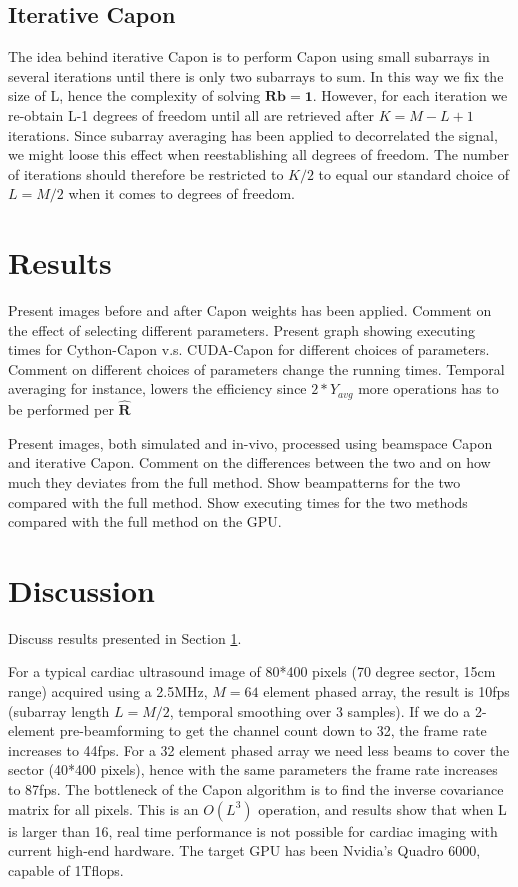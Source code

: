 \documentclass[journal]{IEEEtran}
\newcommand{\mat}[1]{\mathbf{#1}}
\renewcommand{\vec}[1]{\mathbf{#1}}
\begin{document}
\subsection{Iterative Capon}
The idea behind iterative Capon is to perform Capon using small subarrays in several iterations until there is only two subarrays to sum. In this way we fix the size of L, hence the complexity of solving $\mat{R}\vec{b} = \vec{1}$. However, for each iteration we re-obtain L-1 degrees of freedom until all are retrieved after $K = M-L+1$ iterations. Since subarray averaging has been applied to decorrelated the signal, we might loose this effect when reestablishing all degrees of freedom. The number of iterations should therefore be restricted to $K/2$ to equal our standard choice of $L = M/2$ when it comes to degrees of freedom.   

\section{Results}\label{sec:res}

Present images before and after Capon weights has been applied. Comment on the effect of selecting different parameters. Present graph showing executing times for Cython-Capon v.s. CUDA-Capon for different choices of parameters. Comment on different choices of parameters change the running times. Temporal averaging for instance, lowers the efficiency since $2*Y_{avg}$ more operations has to be performed per $\mat{\hat{R}}$    

Present images, both simulated and in-vivo, processed using beamspace Capon and iterative Capon. Comment on the differences between the two and on how much they deviates from the full method.
Show beampatterns for the two compared with the full method. Show executing times for the two methods compared with the full method on the GPU.

\section{Discussion}\label{sec:dis}
Discuss results presented in Section \ref{sec:res}.

For a typical cardiac ultrasound image of 80*400 pixels (70 degree sector, 15cm range) acquired using a 2.5MHz, $M=64$ element phased array, the result is 10fps (subarray length $L=M/2$, temporal smoothing over 3 samples). If we do a 2-element pre-beamforming to get the channel count down to 32, the frame rate increases to 44fps. For a 32 element phased array we need less beams to cover the sector (40*400 pixels), hence with the same parameters the frame rate increases to 87fps. The bottleneck of the Capon algorithm is to find the inverse covariance matrix for all pixels. This is an $O(L^3)$ operation, and results show that when L is larger than 16, real time performance is not possible for cardiac imaging with current high-end hardware. The target GPU has been Nvidia’s Quadro 6000, capable of 1Tflops.
\end{document}
